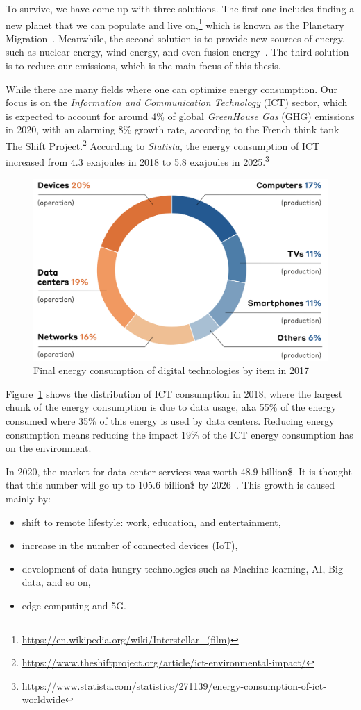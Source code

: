 To survive, we have come up with three solutions.
The first one includes finding a new planet that we can populate and live on,\footnote{\url{https://en.wikipedia.org/wiki/Interstellar_(film)}} which is known as the Planetary Migration~\cite{mapstone2022cyanobacteria}.
Meanwhile, the second solution is to provide new sources of energy, such as nuclear energy, wind energy, and even fusion energy~\cite{gross1984fusion}.
The third solution is to reduce our emissions, which is the main focus of this thesis.

While there are many fields where one can optimize energy consumption.
Our focus is on the \emph{Information and Communication Technology} (ICT) sector, which is expected to account for around 4\% of global \emph{GreenHouse Gas} (GHG) emissions in 2020, with an alarming 8\% growth rate, according to the French think tank The Shift Project.\footnote{\url{ https://www.theshiftproject.org/article/ict-environmental-impact/}}
According to \emph{Statista}, the energy consumption of ICT increased from 4.3 exajoules in 2018 to 5.8 exajoules in 2025.\footnote{\url{https://www.statista.com/statistics/271139/energy-consumption-of-ict-worldwide}}

\begin{figure}[!h]
    \centering
    \includegraphics[width=.7\linewidth]{chapters/distribution_of_ict_consumption.png}
    \caption{Final energy consumption of digital technologies by item in 2017}
    \label{fig:distribution_of_ict_consumption}
\end{figure}

Figure~\ref{fig:distribution_of_ict_consumption} shows the distribution of ICT consumption in 2018, where the largest chunk of the energy consumption is due to data usage, aka 55\% of the energy consumed where 35\% of this energy is used by data centers.
Reducing energy consumption means reducing the impact 19\% of the ICT energy consumption has on the environment.

In 2020, the market for data center services was worth 48.9 billion\$.
It is thought that this number will go up to 105.6 billion\$ by 2026~\cite{inshakova2022data}.
This growth is caused mainly by:
\begin{itemize}
    \item shift to remote lifestyle: work, education, and entertainment,
    \item increase in the number of connected devices (IoT),
    \item development of data-hungry technologies such as Machine learning, AI, Big data, and so on,
    \item edge computing and 5G.
\end{itemize}

